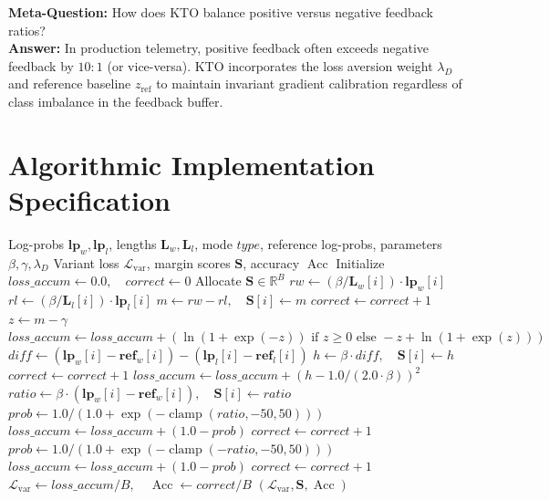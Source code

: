 \documentclass[11pt,a4paper]{article}
\theoremstyle{definition}
\begin{document}
\textbf{Meta-Question:} How does KTO balance positive versus negative feedback ratios?\\
\textbf{Answer:} In production telemetry, positive feedback often exceeds negative feedback by $10:1$ (or vice-versa). KTO incorporates the loss aversion weight $\lambda_D$ and reference baseline $z_{\text{ref}}$ to maintain invariant gradient calibration regardless of class imbalance in the feedback buffer.

\section{Algorithmic Implementation Specification}

\begin{algorithm}[H]
\caption{Unified DPO Variant Loss Evaluation (SimPO, KTO, IPO)}
\begin{algorithmic}[1]
\Require Log-probs $\mathbf{lp}_w, \mathbf{lp}_l$, lengths $\mathbf{L}_w, \mathbf{L}_l$, mode $type$, reference log-probs, parameters $\beta, \gamma, \lambda_D$
\Ensure Variant loss $\mathcal{L}_{\text{var}}$, margin scores $\mathbf{S}$, accuracy $\operatorname{Acc}$
\State Initialize $loss\_accum \gets 0.0, \quad correct \gets 0$
\State Allocate $\mathbf{S} \in \mathbb{R}^B$
        \State $rw \gets (\beta / \mathbf{L}_w[i]) \cdot \mathbf{lp}_w[i]$
        \State $rl \gets (\beta / \mathbf{L}_l[i]) \cdot \mathbf{lp}_l[i]$
        \State $m \gets rw - rl, \quad \mathbf{S}[i] \gets m$
         \State $correct \gets correct + 1$ \EndIf
        \State $z \gets m - \gamma$
        \State $loss\_accum \gets loss\_accum + (\ln(1 + \exp(-z)) \text{ if } z \ge 0 \text{ else } -z + \ln(1 + \exp(z)))$
        \State $diff \gets (\mathbf{lp}_w[i] - \mathbf{ref}_w[i]) - (\mathbf{lp}_l[i] - \mathbf{ref}_l[i])$
        \State $h \gets \beta \cdot diff, \quad \mathbf{S}[i] \gets h$
         \State $correct \gets correct + 1$ \EndIf
        \State $loss\_accum \gets loss\_accum + (h - 1.0 / (2.0 \cdot \beta))^2$
        \State $ratio \gets \beta \cdot (\mathbf{lp}_w[i] - \mathbf{ref}_w[i]), \quad \mathbf{S}[i] \gets ratio$
            \State $prob \gets 1.0 / (1.0 + \exp(-\operatorname{clamp}(ratio, -50, 50)))$
            \State $loss\_accum \gets loss\_accum + (1.0 - prob)$
             \State $correct \gets correct + 1$ \EndIf
        \Else
            \State $prob \gets 1.0 / (1.0 + \exp(-\operatorname{clamp}(-ratio, -50, 50)))$
            \State $loss\_accum \gets loss\_accum + (1.0 - prob)$
             \State $correct \gets correct + 1$ \EndIf
        \EndIf
    \EndIf
\EndFor
\State $\mathcal{L}_{\text{var}} \gets loss\_accum / B, \quad \operatorname{Acc} \gets correct / B$
\State \Return $(\mathcal{L}_{\text{var}}, \mathbf{S}, \operatorname{Acc})$
\end{algorithmic}
\end{algorithm}
\end{document}
